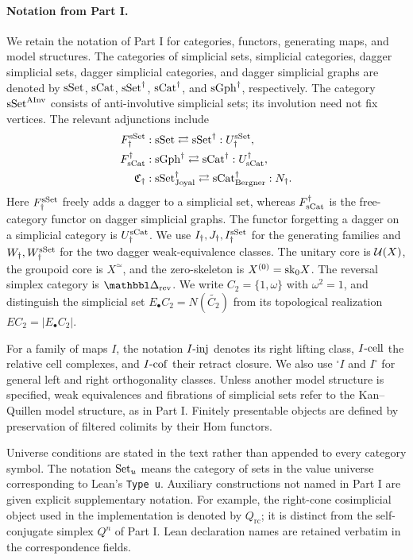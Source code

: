 \paragraph{Notation from Part I.}
We retain the notation of Part I for categories, functors, generating maps, and model structures.
The categories of simplicial sets, simplicial categories, dagger simplicial sets, dagger simplicial categories, and dagger simplicial graphs are denoted by
$\mathrm{sSet}$, $\mathrm{sCat}$, $\mathrm{sSet}^{\dag}$, $\mathrm{sCat}^{\dag}$, and $\mathrm{sGph}^{\dag}$, respectively.
The category $\mathrm{sSet}^{\mathrm{AInv}}$ consists of anti-involutive simplicial sets; its involution need not fix vertices.
The relevant adjunctions include
\begin{align}
F_{\dag}^{\mathrm{sSet}} &: \mathrm{sSet}\rightleftarrows\mathrm{sSet}^{\dag}:U_{\dag}^{\mathrm{sSet}},\\
F_{\mathrm{sCat}}^{\dag} &: \mathrm{sGph}^{\dag}\rightleftarrows\mathrm{sCat}^{\dag}:U_{\mathrm{sCat}}^{\dag},\\
\mathfrak{C}_{\dag} &: \mathrm{sSet}^{\dag}_{\mathrm{Joyal}}\rightleftarrows\mathrm{sCat}^{\dag}_{\mathrm{Bergner}}:N_{\dag}.
\end{align}
Here $F_{\dag}^{\mathrm{sSet}}$ freely adds a dagger to a simplicial set, whereas $F_{\mathrm{sCat}}^{\dag}$ is the free-category functor on dagger simplicial graphs.
The functor forgetting a dagger on a simplicial category is $U_{\dag}^{\mathrm{sCat}}$.
We use $I_{\dag},J_{\dag},I^{\mathrm{sSet}}_{\dag}$ for the generating families and $W_{\dag},W^{\mathrm{sSet}}_{\dag}$ for the two dagger weak-equivalence classes.
The unitary core is $\mathcal{U}(X)$, the groupoid core is $X^{\simeq}$, and the zero-skeleton is $X^{(0)}=\mathrm{sk}_0X$.
The reversal simplex category is $\prism_{\rev}$.
We write $C_2=\{1,\omega\}$ with $\omega^2=1$, and distinguish the simplicial set $E_{\bullet}C_2=N(\widetilde{C_2})$ from its topological realization $EC_2=|E_{\bullet}C_2|$.

For a family of maps $I$, the notation $I\text{-}\mathrm{inj}$ denotes its right lifting class, $I\text{-}\mathrm{cell}$ the relative cell complexes, and $I\text{-}\mathrm{cof}$ their retract closure.
We also use ${}^{\square}I$ and $I^{\square}$ for general left and right orthogonality classes.
Unless another model structure is specified, weak equivalences and fibrations of simplicial sets refer to the Kan--Quillen model structure, as in Part I.
Finitely presentable objects are defined by preservation of filtered colimits by their Hom functors.

Universe conditions are stated in the text rather than appended to every category symbol.
The notation $\mathrm{Set}_u$ means the category of sets in the value universe corresponding to Lean's \texttt{Type u}.
Auxiliary constructions not named in Part I are given explicit supplementary notation.
For example, the right-cone cosimplicial object used in the implementation is denoted by $Q_{\mathrm{rc}}$; it is distinct from the self-conjugate simplex $Q^n$ of Part I.
Lean declaration names are retained verbatim in the correspondence fields.

